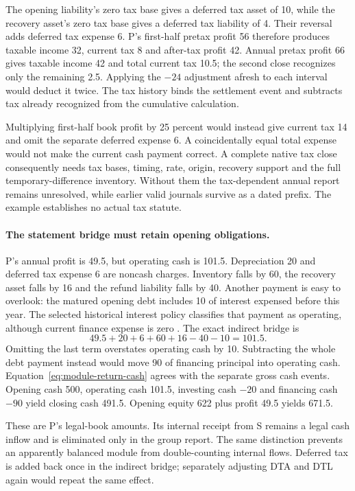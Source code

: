 The opening liability's zero tax base gives a deferred tax asset of 10, while
the recovery asset's zero tax base gives a deferred tax liability of 4. Their
reversal adds deferred tax expense 6. P's first-half pretax profit 56 therefore
produces taxable income 32, current tax 8 and after-tax profit 42. Annual
pretax profit 66 gives taxable income 42 and total current tax 10.5; the
second close recognizes only the remaining 2.5. Applying the $-24$ adjustment
afresh to each interval would deduct it twice. The tax history binds the
settlement event and subtracts tax already recognized from the cumulative
calculation.

Multiplying first-half book profit by 25 percent would instead give current
tax 14 and omit the separate deferred expense 6. A coincidentally equal total
expense would not make the current cash payment correct. A complete native
tax close consequently needs tax bases, timing, rate, origin, recovery support
and the full temporary-difference inventory. Without them the tax-dependent
annual report remains unresolved, while earlier valid journals survive as a
dated prefix. The example establishes no actual tax statute.

\paragraph{The statement bridge must retain opening obligations.}
P's annual profit is 49.5, but operating cash is 101.5. Depreciation 20 and
deferred tax expense 6 are noncash charges. Inventory falls by 60, the recovery
asset falls by 16 and the refund liability falls by 40. Another payment is
easy to overlook: the matured opening debt includes 10 of interest expensed
before this year. The selected historical interest policy classifies that
payment as operating, although current finance expense is zero
\citep[IAS~7.31--33]{eu20231803}. The exact indirect bridge is
\begin{equation}
 49.5+20+6+60+16-40-10=101.5.
 \label{eq:module-return-cash}
\end{equation}
Omitting the last term overstates operating cash by 10. Subtracting the whole
debt payment instead would move 90 of financing principal into operating
cash. Equation~\eqref{eq:module-return-cash} agrees with the separate gross
cash events. Opening cash 500, operating cash 101.5, investing cash $-20$ and
financing cash $-90$ yield closing cash 491.5. Opening equity 622 plus profit
49.5 yields 671.5.

These are P's legal-book amounts. Its internal receipt from S remains a legal
cash inflow and is eliminated only in the group report. The same distinction
prevents an apparently balanced module from double-counting internal flows.
Deferred tax is added back once in the indirect bridge; separately adjusting
DTA and DTL again would repeat the same effect.

